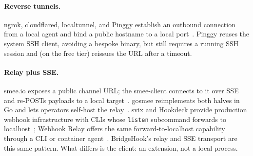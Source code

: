 \documentclass[11pt]{article}
\begin{document}
\paragraph{Reverse tunnels.} ngrok, cloudflared, localtunnel, and Pinggy
establish an outbound connection from a local agent and bind a public hostname
to a local port~\cite{ngrok,cloudflaretunnel,localtunnel,pinggy}. Pinggy reuses
the system SSH client, avoiding a bespoke binary, but still requires a running
SSH session and (on the free tier) reissues the URL after a timeout.

\paragraph{Relay plus SSE.} smee.io exposes a public channel URL; the
smee-client connects to it over SSE and re-POSTs payloads to a local
target~\cite{smeeio,smeeclient}. gosmee reimplements both halves in Go and lets
operators self-host the relay~\cite{gosmee}. svix and Hookdeck provide
production webhook infrastructure with CLIs whose \texttt{listen} subcommand
forwards to localhost~\cite{svixcli,hookdeck}; Webhook Relay offers the same
forward-to-localhost capability through a CLI or container
agent~\cite{webhookrelay}. BridgeHook's relay and SSE transport are this same
pattern. What differs is the client: an extension, not a local process.
\end{document}
